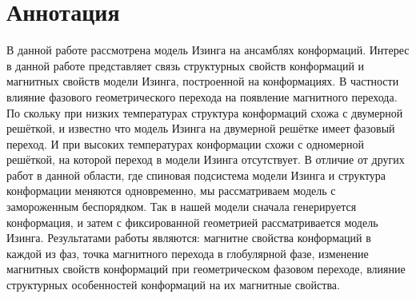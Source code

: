 \section*{Аннотация}


В данной работе рассмотрена модель Изинга на ансамблях конформаций. 
Интерес в данной работе представляет связь структурных свойств конформаций и магнитных свойств модели Изинга, построенной на конформациях. В частности влияние фазового геометрического перехода на появление магнитного перехода. По скольку при низких температурах структура конформаций схожа с двумерной решёткой, и известно что модель Изинга на двумерной решётке имеет фазовый переход. И при высоких температурах конформации схожи с одномерной решёткой, на которой переход в модели Изинга отсутствует.
В отличие от других работ в данной области, где спиновая подсистема модели Изинга и структура конформации меняются одновременно, мы рассматриваем модель с замороженным беспорядком. Так в нашей модели сначала генерируется конформация, и затем с фиксированной геометрией рассматривается модель Изинга.
Результатами работы являются: магнитне свойства конформаций в каждой из фаз, точка магнитного перехода в глобулярной фазе, изменение магнитных свойств конформаций при геометрическом фазовом переходе, влияние структурных особенностей конформаций на их магнитные свойства.
